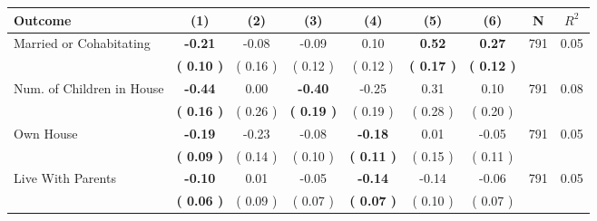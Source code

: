 \begin{tabular}{lcccccccc}
\toprule
 \textbf{Outcome} & \textbf{(1)} & \textbf{(2)} & \textbf{(3)} & \textbf{(4)} & \textbf{(5)} & \textbf{(6)} & \textbf{N} & \textbf{$ R^2$} \\
\midrule
Married or Cohabitating & \textbf{    -0.21} &     -0.08 &     -0.09 &      0.10 & \textbf{     0.52} & \textbf{     0.27} & 791 &       0.05 \\ 
 & \textbf{(     0.10 )} & (     0.16 ) & (     0.12 ) & (     0.12 ) & \textbf{(     0.17 )} & \textbf{(     0.12 )} & \\
Num. of Children in House & \textbf{    -0.44} &      0.00 & \textbf{    -0.40} &     -0.25 &      0.31 &      0.10 & 791 &       0.08 \\ 
 & \textbf{(     0.16 )} & (     0.26 ) & \textbf{(     0.19 )} & (     0.19 ) & (     0.28 ) & (     0.20 ) & \\
Own House & \textbf{    -0.19} &     -0.23 &     -0.08 & \textbf{    -0.18} &      0.01 &     -0.05 & 791 &       0.05 \\ 
 & \textbf{(     0.09 )} & (     0.14 ) & (     0.10 ) & \textbf{(     0.11 )} & (     0.15 ) & (     0.11 ) & \\
Live With Parents & \textbf{    -0.10} &      0.01 &     -0.05 & \textbf{    -0.14} &     -0.14 &     -0.06 & 791 &       0.05 \\ 
 & \textbf{(     0.06 )} & (     0.09 ) & (     0.07 ) & \textbf{(     0.07 )} & (     0.10 ) & (     0.07 ) & \\
\bottomrule
\end{tabular}
